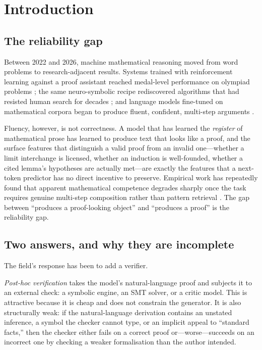 \documentclass[11pt,a4paper]{article}
\theoremstyle{definition}
\theoremstyle{plain}
\theoremstyle{remark}
\begin{document}
\section{Introduction}
\label{sec:intro}

\subsection{The reliability gap}

Between 2022 and 2026, machine mathematical reasoning moved from word problems
to research-adjacent results. Systems trained with reinforcement learning
against a proof assistant reached medal-level performance on olympiad problems
\cite{hubert2026olympiad,chervonyi2025gold}; the same neuro-symbolic recipe
rediscovered algorithms that had resisted human search for decades
\cite{fawzi2022discovering,romera2024mathematical}; and language models
fine-tuned on mathematical corpora began to produce fluent, confident,
multi-step arguments \cite{azerbayev2024llemma}.

Fluency, however, is not correctness. A model that has learned the
\emph{register} of mathematical prose has learned to produce text that looks
like a proof, and the surface features that distinguish a valid proof from an
invalid one---whether a limit interchange is licensed, whether an induction is
well-founded, whether a cited lemma's hypotheses are actually met---are exactly
the features that a next-token predictor has no direct incentive to preserve.
Empirical work has repeatedly found that apparent mathematical competence
degrades sharply once the task requires genuine multi-step composition rather
than pattern retrieval \cite{frieder2023mathematical}. The gap between
``produces a proof-looking object'' and ``produces a proof'' is the reliability
gap.

\subsection{Two answers, and why they are incomplete}

The field's response has been to add a verifier.

\emph{Post-hoc verification} takes the model's natural-language proof and
subjects it to an external check: a symbolic engine, an SMT solver, or a
critic model. This is attractive because it is cheap and does not constrain the
generator. It is also structurally weak: if the natural-language derivation
contains an unstated inference, a symbol the checker cannot type, or an
implicit appeal to ``standard facts,'' then the checker either fails on a
correct proof or---worse---succeeds on an incorrect one by checking a weaker
formalisation than the author intended.
\end{document}
